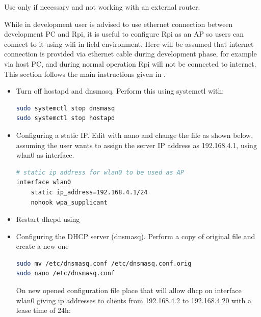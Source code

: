 \begin{mdframed}[backgroundcolor=red!20, roundcorner=10pt, innertopmargin=5pt, innerbottommargin=5pt, skipabove=0pt]
    Use only if necessary and not working with an external router.
\end{mdframed}

While in development user is advised to use ethernet connection between development PC and \gls{Rpi}, it is useful to configure \gls{Rpi} as an \gls{AP} so users can connect to it using wifi in field environment. Here will be assumed that internet connection is provided via ethernet cable during development phase, for example via host PC, and during normal operation \gls{Rpi} will not be connected to internet. This section follows the main instructions given in \cite{raspberry_AP}.
\begin{itemize}
	\tightlist
	\item Turn off hostapd and dnsmasq. Perform this using systemctl with:
	\begin{lstlisting}[frame=none,language=bash,backgroundcolor=\color{gray!15},numbers=none,		basicstyle=\ttfamily]
sudo systemctl stop dnsmasq
sudo systemctl stop hostapd
\end{lstlisting}
	\item Configuring a static IP. Edit  with nano and change the file as shown below, assuming the user wants to assign the server IP address as 192.168.4.1, using wlan0 as interface.
	\begin{lstlisting}[frame=none,language=bash,backgroundcolor=\color{gray!15},numbers=none,		basicstyle=\ttfamily]
# static ip address for wlan0 to be used as AP
interface wlan0
    static ip_address=192.168.4.1/24
    nohook wpa_supplicant
\end{lstlisting}
   	\item Restart dhcpd using 
   	\item Configuring the DHCP server (dnsmasq). Perform a copy of original file and create a new one
\begin{lstlisting}[frame=none,language=bash,backgroundcolor=\color{gray!15},numbers=none,		basicstyle=\ttfamily]
sudo mv /etc/dnsmasq.conf /etc/dnsmasq.conf.orig  
sudo nano /etc/dnsmasq.conf
\end{lstlisting}
   	On new opened configuration file place that will allow dhcp on interface wlan0 giving ip addresses to clients from 192.168.4.2 to 192.168.4.20 with a lease time of 24h:
   	\begin{lstlisting}[frame=none,language=bash,backgroundcolor=\color{gray!15},numbers=none,		basicstyle=\ttfamily]

\end{lstlisting}
\end{itemize}
